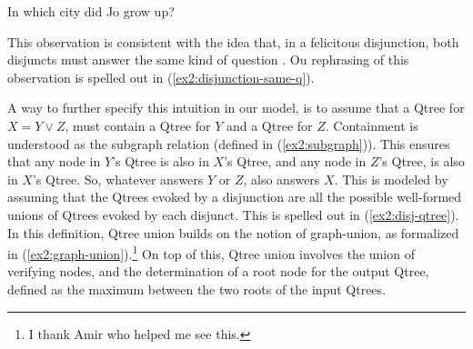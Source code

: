 \begin{exe}
	 {In which city did Jo grow up?}
	\label{ex2:city-disjunction}
\end{exe}

This observation is consistent with the idea that, in a felicitous disjunction, both disjuncts must answer the same kind of question \citep{Simons2001,Zhang2022}. Ou rephrasing of this observation is spelled out in (\ref{ex2:disjunction-same-q}). 

\begin{exe}
	\label{ex2:disjunction-same-q}
\end{exe}


A way to further specify this intuition in our model, is to assume that a Qtree for $X = Y \vee Z$, must contain a Qtree for $Y$ and a Qtree for $Z$. Containment is understood as the subgraph relation (defined in (\ref{ex2:subgraph})). This ensures that any node in $Y$'s Qtree is also in $X$'s Qtree, and any node in $Z$'s Qtree, is also in $X$'s Qtree. So, whatever answers $Y$ or $Z$, also answers $X$. This is modeled by assuming that the Qtrees evoked by a disjunction are all the possible well-formed unions of Qtrees evoked by each disjunct. This is spelled out in (\ref{ex2:disj-qtree}). In this definition, Qtree union builds on the notion of graph-union, as formalized in (\ref{ex2:graph-union}).\footnote{I thank Amir who helped me see this.} On top of this, Qtree union involves the union of verifying nodes, and the determination of a root node for the output Qtree, defined as the maximum between the two roots of the input Qtrees.



